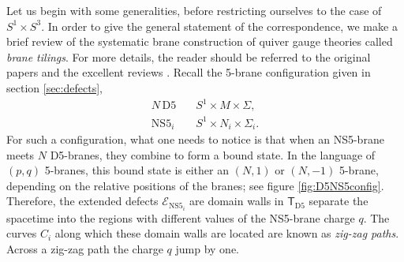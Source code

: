 Let us begin with some generalities, before restricting ourselves to the case of $S^1\times S^3$.
In order to give the general statement of the correspondence,
we make a brief review of the systematic brane construction of quiver gauge theories
called \emph{brane tilings}. For more details, the reader should be
referred to the original papers and the excellent reviews
\cite{Hanany:2005ve,Franco:2005rj,Kennaway:2007tq,Yamazaki:2008bt}.
Recall the 5-brane configuration given in section \ref{sec:defects},
\begin{align*}
    N\,\mathrm{D5}    & \quad S^{1} \times M \times \Sigma,  \\
    \mathrm{NS5}_{i}  & \quad S^{1} \times N_{i} \times \Sigma_{i}.
\end{align*}
For such a configuration, what one needs to notice is that when an
NS5-brane meets $N$ D5-branes, they combine to form a bound state.
In the language of $( p,q )$ 5-branes, this bound state
is either an $( N,1 )$ or $( N,-1 )$ 5-brane,
depending on the relative positions of the branes; see figure \ref{fig:D5NS5config}. Therefore,
the extended defects $\mathcal{E}_{\mathrm{NS5}_{i}}$ are domain
walls in $\mathsf{T}_{\mathrm{D5}}$ separate the spacetime into the
regions with different values of the NS5-brane charge $q$. The curves
$C_{i}$ along which these domain walls are located are known as \emph{zig-zag
paths}. Across a zig-zag path the charge $q$ jump by one.


